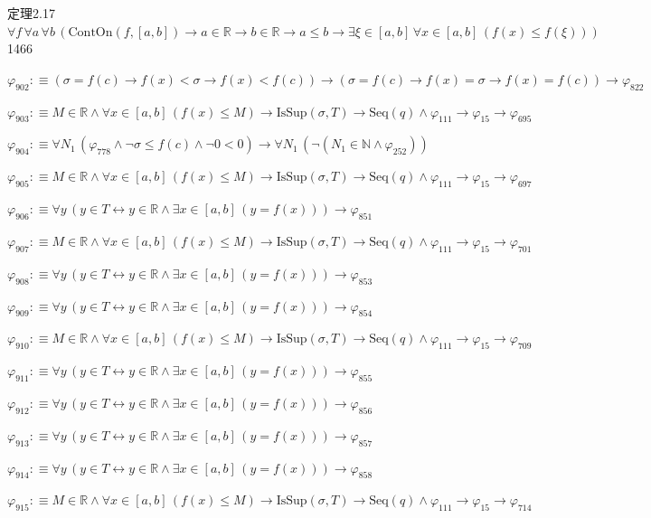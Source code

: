 \begin{fullproof}{定理2.17}{$\forall f\,\forall a\,\forall b\,(\mathrm{ContOn}(f,[a,b]) \to a \in \mathbb{R} \to b \in \mathbb{R} \to a \leq b \to \exists \xi \in [a,b]\,\forall x \in [a,b]\,(f(x) \leq f(\xi)))$}{1466}
\begin{abbrevlist}
\item $\varphi_{902} :\equiv (\sigma = f(c) \to f(x) < \sigma \to f(x) < f(c)) \to (\sigma = f(c) \to f(x) = \sigma \to f(x) = f(c)) \to \varphi_{822}$
\item $\varphi_{903} :\equiv M \in \mathbb{R} \land \forall x \in [a,b]\,(f(x) \leq M) \to \mathrm{IsSup}(\sigma,T) \to \mathrm{Seq}(q) \land \varphi_{111} \to \varphi_{15} \to \varphi_{695}$
\item $\varphi_{904} :\equiv \forall N_{1}\,(\varphi_{778} \land \neg \sigma \leq f(c) \land \neg 0 < 0) \to \forall N_{1}\,(\neg (N_{1} \in \mathbb{N} \land \varphi_{252}))$
\item $\varphi_{905} :\equiv M \in \mathbb{R} \land \forall x \in [a,b]\,(f(x) \leq M) \to \mathrm{IsSup}(\sigma,T) \to \mathrm{Seq}(q) \land \varphi_{111} \to \varphi_{15} \to \varphi_{697}$
\item $\varphi_{906} :\equiv \forall y\,(y \in T \leftrightarrow y \in \mathbb{R} \land \exists x \in [a,b]\,(y = f(x))) \to \varphi_{851}$
\item $\varphi_{907} :\equiv M \in \mathbb{R} \land \forall x \in [a,b]\,(f(x) \leq M) \to \mathrm{IsSup}(\sigma,T) \to \mathrm{Seq}(q) \land \varphi_{111} \to \varphi_{15} \to \varphi_{701}$
\item $\varphi_{908} :\equiv \forall y\,(y \in T \leftrightarrow y \in \mathbb{R} \land \exists x \in [a,b]\,(y = f(x))) \to \varphi_{853}$
\item $\varphi_{909} :\equiv \forall y\,(y \in T \leftrightarrow y \in \mathbb{R} \land \exists x \in [a,b]\,(y = f(x))) \to \varphi_{854}$
\item $\varphi_{910} :\equiv M \in \mathbb{R} \land \forall x \in [a,b]\,(f(x) \leq M) \to \mathrm{IsSup}(\sigma,T) \to \mathrm{Seq}(q) \land \varphi_{111} \to \varphi_{15} \to \varphi_{709}$
\item $\varphi_{911} :\equiv \forall y\,(y \in T \leftrightarrow y \in \mathbb{R} \land \exists x \in [a,b]\,(y = f(x))) \to \varphi_{855}$
\item $\varphi_{912} :\equiv \forall y\,(y \in T \leftrightarrow y \in \mathbb{R} \land \exists x \in [a,b]\,(y = f(x))) \to \varphi_{856}$
\item $\varphi_{913} :\equiv \forall y\,(y \in T \leftrightarrow y \in \mathbb{R} \land \exists x \in [a,b]\,(y = f(x))) \to \varphi_{857}$
\item $\varphi_{914} :\equiv \forall y\,(y \in T \leftrightarrow y \in \mathbb{R} \land \exists x \in [a,b]\,(y = f(x))) \to \varphi_{858}$
\item $\varphi_{915} :\equiv M \in \mathbb{R} \land \forall x \in [a,b]\,(f(x) \leq M) \to \mathrm{IsSup}(\sigma,T) \to \mathrm{Seq}(q) \land \varphi_{111} \to \varphi_{15} \to \varphi_{714}$

\end{abbrevlist}
\end{fullproof}

